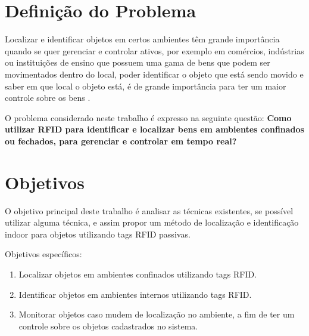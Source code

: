 \section{Definição do Problema}

Localizar e identificar objetos em certos ambientes têm grande importância quando se quer gerenciar e controlar ativos, por exemplo em comércios, indústrias ou instituições de ensino que possuem uma gama de bens que podem ser movimentados dentro do local,  poder identificar o objeto que está sendo movido e saber em que local o objeto está, é de grande importância para ter um maior controle sobre os bens \cite{realtimeRFID2016}. 

\par
O problema considerado neste trabalho é expresso na seguinte questão: \textbf{ Como utilizar RFID para identificar e localizar bens em ambientes confinados ou fechados, para gerenciar e controlar em tempo real?}
\section{Objetivos}
O objetivo principal deste trabalho é analisar as técnicas existentes, se possível utilizar alguma técnica, e assim propor um método de localização e identificação indoor para objetos utilizando tags RFID passivas.
\par
Objetivos específicos:
\begin{enumerate}

    \item Localizar objetos em ambientes confinados utilizando tags RFID.
    
    \item Identificar objetos em ambientes internos utilizando tags RFID.
    
    \item Monitorar objetos caso mudem de localização no ambiente, a fim de ter um controle sobre os objetos cadastrados no sistema.
    
\end{enumerate}


